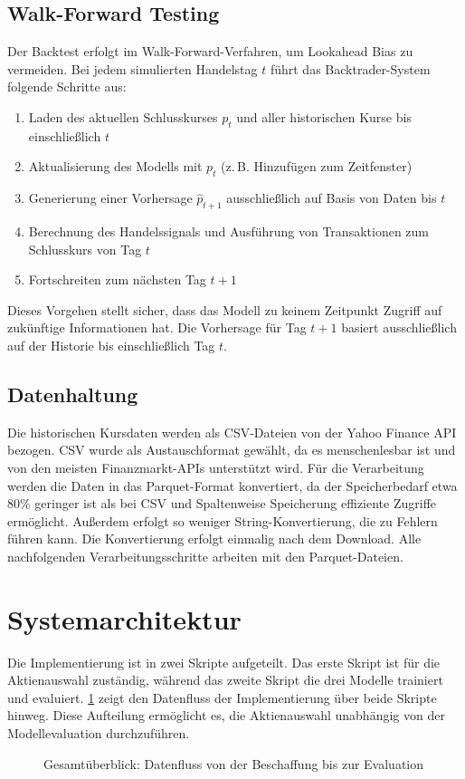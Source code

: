 \subsection{Walk-Forward Testing}\label{subsec:walkforward}
Der Backtest erfolgt im Walk-Forward-Verfahren, um Lookahead Bias zu vermeiden. Bei jedem simulierten Handelstag $t$ führt das Backtrader-System folgende Schritte aus:

\begin{enumerate}
    \item Laden des aktuellen Schlusskurses $p_t$ und aller historischen Kurse bis einschließlich $t$
    \item Aktualisierung des Modells mit $p_t$ (z.\,B. Hinzufügen zum Zeitfenster)
    \item Generierung einer Vorhersage $\hat{p}_{t+1}$ ausschließlich auf Basis von Daten bis $t$
    \item Berechnung des Handelssignals und Ausführung von Transaktionen zum Schlusskurs von Tag $t$
    \item Fortschreiten zum nächsten Tag $t+1$
\end{enumerate}

Dieses Vorgehen stellt sicher, dass das Modell zu keinem Zeitpunkt Zugriff auf zukünftige Informationen hat. Die Vorhersage für Tag $t+1$ basiert ausschließlich auf der Historie bis einschließlich Tag $t$.

\subsection{Datenhaltung}\label{subsec:datenhaltung}
Die historischen Kursdaten werden als CSV-Dateien von der Yahoo Finance API bezogen. CSV wurde als Austauschformat gewählt, da es menschenlesbar ist und von den meisten Finanzmarkt-APIs unterstützt wird. Für die Verarbeitung werden die Daten in das Parquet-Format konvertiert, da der Speicherbedarf etwa 80\% geringer ist als bei CSV und Spaltenweise Speicherung effiziente Zugriffe ermöglicht. Außerdem erfolgt so weniger String-Konvertierung, die zu Fehlern führen kann. Die Konvertierung erfolgt einmalig nach dem Download. Alle nachfolgenden Verarbeitungsschritte arbeiten mit den Parquet-Dateien.

\section{Systemarchitektur}\label{sec:systemarchitektur}

Die Implementierung ist in zwei Skripte aufgeteilt. Das erste Skript ist für die Aktienauswahl zuständig, während das zweite Skript die drei Modelle trainiert und evaluiert. \cref{fig:gesamtueberblick_datenfluss} zeigt den Datenfluss der Implementierung über beide Skripte hinweg. Diese Aufteilung ermöglicht es, die Aktienauswahl unabhängig von der Modellevaluation durchzuführen.
\begin{figure}[htbp]
    \centering
    
    \caption{Gesamtüberblick: Datenfluss von der Beschaffung bis zur Evaluation}
    \label{fig:gesamtueberblick_datenfluss}
\end{figure}

